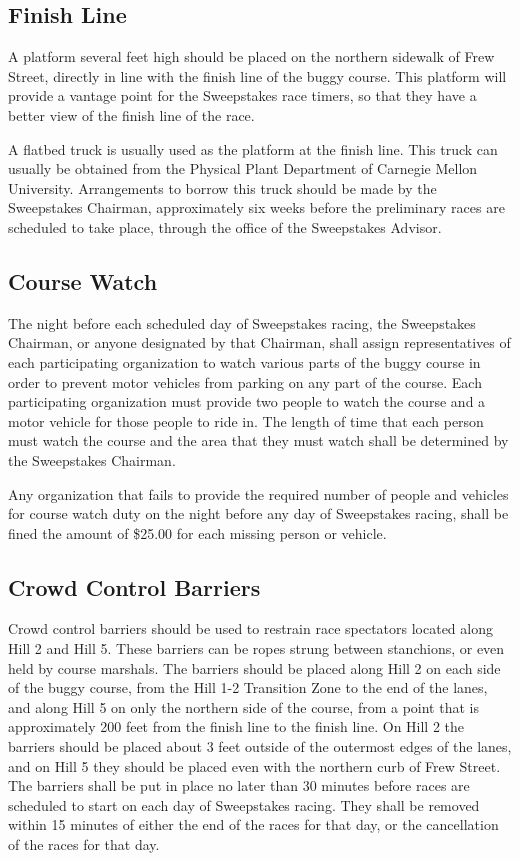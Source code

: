 \subsection{Finish Line}

	A platform several feet high should be placed on the northern sidewalk of Frew
	Street, directly in line with the finish line of the buggy course. This
	platform will provide a vantage point for the Sweepstakes race timers, so that
	they have a better view of the finish line of the race.

	A flatbed truck is usually used as the platform at the finish line. This truck
	can usually be obtained from the Physical Plant Department of Carnegie Mellon
	University. Arrangements to borrow this truck should be made by the Sweepstakes
	Chairman, approximately six weeks before the preliminary races are scheduled to
	take place, through the office of the Sweepstakes Advisor.

\subsection{Course Watch}

	The night before each scheduled day of Sweepstakes racing, the Sweepstakes
	Chairman, or anyone designated by that Chairman, shall assign representatives
	of each participating organization to watch various parts of the buggy course
	in order to prevent motor vehicles from parking on any part of the course. Each
	participating organization must provide two people to watch the course and a
	motor vehicle for those people to ride in. The length of time that each person
	must watch the course and the area that they must watch shall be determined by
	the Sweepstakes Chairman.

	Any organization that fails to provide the required number of people and
	vehicles for course watch duty on the night before any day of Sweepstakes
	racing, shall be fined the amount of \$25.00 for each missing person or
	vehicle.

\subsection{Crowd Control Barriers}

	Crowd control barriers should be used to restrain race spectators located along
	Hill 2 and Hill 5. These barriers can be ropes strung between stanchions, or
	even held by course marshals. The barriers should be placed along Hill 2 on
	each side of the buggy course, from the Hill 1-2 Transition Zone to the end of
	the lanes, and along Hill 5 on only the northern side of the course, from a
	point that is approximately 200 feet from the finish line to the finish line.
	On Hill 2 the barriers should be placed about 3 feet outside of the outermost
	edges of the lanes, and on Hill 5 they should be placed even with the northern
	curb of Frew Street. The barriers shall be put in place no later than 30
	minutes before races are scheduled to start on each day of Sweepstakes racing.
	They shall be removed within 15 minutes of either the end of the races for that
	day, or the cancellation of the races for that day.

